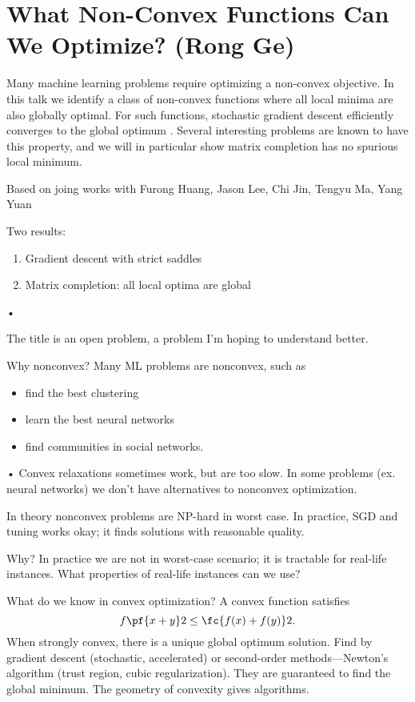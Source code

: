 \section{What Non-Convex Functions Can We Optimize? (Rong Ge)}

Many machine learning problems require optimizing a non-convex objective. In this talk we identify a class of non-convex functions where all local minima are also globally optimal. For such functions, stochastic gradient descent efficiently converges to the global optimum . Several interesting problems are known to have this property, and we will in particular show matrix completion has no spurious local minimum.

Based on joing works with Furong Huang, Jason Lee, Chi Jin, Tengyu Ma, Yang Yuan

Two results:
\begin{enumerate}
\item
Gradient descent with strict saddles
\item
Matrix completion: all local optima are global
\end{enumerate}•

The title is an open problem, a problem I'm hoping to understand better.

Why nonconvex? Many ML problems are nonconvex, such as
\begin{itemize}
\item
find the best clustering
\item
learn the best neural networks
\item
find communities in social networks.
\end{itemize}•
Convex relaxations sometimes work, but are too slow. In some problems (ex. neural networks) we don't have alternatives to nonconvex optimization.

In theory nonconvex problems are NP-hard in worst case. In practice, SGD and tuning works okay; it finds solutions with reasonable quality.

Why? In practice we are not in worst-case scenario; it is tractable for real-life instances. What properties of real-life instances can we use?

What do we know in convex optimization? A convex function satisfies
$$
f\pf{x+y}2\le \fc{f(x)+f(y)}2.
$$
When strongly convex, there is a unique global optimum solution. Find by gradient descent (stochastic, accelerated) or second-order methods---Newton's algorithm (trust region, cubic regularization). They are guaranteed to find the global minimum. The geometry of convexity gives algorithms.

